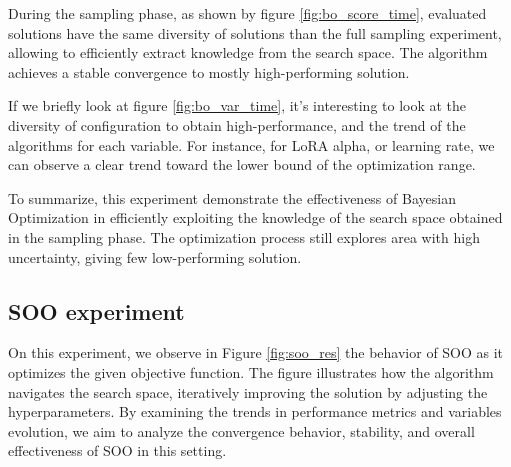 \documentclass[runningheads]{llncs}
\begin{document}
During the sampling phase, as shown by figure \ref{fig:bo_score_time}, evaluated solutions have the same diversity of solutions than the full sampling experiment, allowing to efficiently extract knowledge from the search space. The algorithm achieves a stable convergence to mostly high-performing solution.

If we briefly look at figure \ref{fig:bo_var_time}, it's interesting to look at the diversity of configuration to obtain high-performance, and the trend of the algorithms for each variable. For instance, for LoRA alpha, or learning rate, we can observe a clear trend toward the lower bound of the optimization range. 

To summarize, this experiment demonstrate the effectiveness of Bayesian Optimization in efficiently exploiting the knowledge of the search space obtained in the sampling phase. The optimization process still explores area with high uncertainty, giving few low-performing solution.


\subsection{SOO experiment}
\label{sec:soo_exp}

On this experiment, we observe in Figure \ref{fig:soo_res} the behavior of SOO as it optimizes the given objective function. The figure illustrates how the algorithm navigates the search space, iteratively improving the solution by adjusting the hyperparameters. By examining the trends in performance metrics and variables evolution, we aim to analyze the convergence behavior, stability, and overall effectiveness of SOO in this setting.
\end{document}
